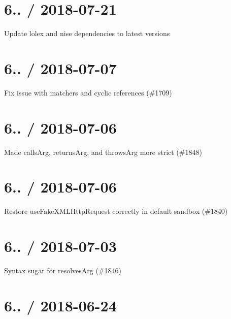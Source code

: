 \section*{6.. / 2018-\/07-\/21 }


\begin{DoxyItemize}
\item Update lolex and nise dependencies to latest versions
\end{DoxyItemize}

\section*{6.. / 2018-\/07-\/07 }


\begin{DoxyItemize}
\item Fix issue with matchers and cyclic references (\#1709)
\end{DoxyItemize}

\section*{6.. / 2018-\/07-\/06 }


\begin{DoxyItemize}
\item Made calls\+Arg, returns\+Arg, and throws\+Arg more strict (\#1848)
\end{DoxyItemize}

\section*{6.. / 2018-\/07-\/06 }


\begin{DoxyItemize}
\item Restore use\+Fake\+X\+M\+L\+Http\+Request correctly in default sandbox (\#1840)
\end{DoxyItemize}

\section*{6.. / 2018-\/07-\/03 }


\begin{DoxyItemize}
\item Syntax sugar for resolves\+Arg (\#1846)
\end{DoxyItemize}

\section*{6.. / 2018-\/06-\/24 }


